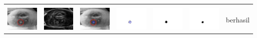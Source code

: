 \begin{table}[H]
\begin{tabular}{|m{0.7in}|m{0.7in}|m{0.7in}|m{0.7in}|m{0.7in}|m{0.7in}|m{0.7in}|}
		&  &  & & & &  \\
		\includegraphics[width=0.7in]{dataset/dataset_3/luka_kuning/ready/17_interp_init.jpg}&
		\includegraphics[width=0.7in]{dataset/dataset_3/luka_kuning/ready/17_interp_ext.jpg}&
		\includegraphics[width=0.7in]{dataset/dataset_3/luka_kuning/ready/17_interp_result.jpg}&
		\includegraphics[width=0.7in]{dataset/dataset_3/luka_kuning/ready/17_gt_r.jpg}&
		\includegraphics[width=0.7in]{dataset/dataset_3/luka_kuning/ready/17_r.jpg}&
		\includegraphics[width=0.7in]{dataset/dataset_3/luka_kuning/ready/17_interp_r.jpg}&
		berhasil\\
		\hline
		

\end{tabular}
\end{table}
